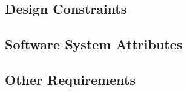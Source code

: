 \documentclass[11pt]{article}
\theoremstyle{definition}
\begin{document}
\subsection{Design Constraints}

\subsection{Software System Attributes}

\subsection{Other Requirements}


\printbibliography
\end{document}
